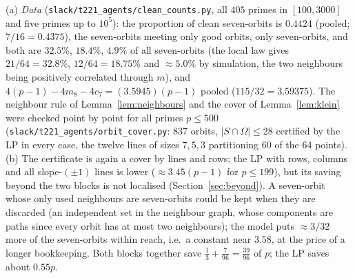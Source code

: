 \begin{remark}
(a) \emph{Data} (\texttt{slack/t221\_agents/clean\_counts.py}, all $405$ primes in $[100,3000]$ and five primes up to $10^5$): the
proportion of clean seven-orbits is $0.4424$ (pooled; $7/16=0.4375$), the seven-orbits meeting only good orbits, only seven-orbits, and
both are $32.5\%$, $18.4\%$, $4.9\%$ of all seven-orbits (the local law gives $21/64=32.8\%$, $12/64=18.75\%$ and $\approx5.0\%$ by
simulation, the two neighbours being positively correlated through $m$), and $4(p-1)-4m_8-4c_7=(3.5945)(p-1)$ pooled
($115/32=3.59375$).  The neighbour rule of Lemma~\ref{lem:neighbours} and the cover of Lemma~\ref{lem:klein} were checked
point by point for all primes $p\le500$ (\texttt{slack/t221\_agents/orbit\_cover.py}: $837$ orbits, $|S\cap\Omega|\le28$ certified by
the LP in every case, the twelve lines of sizes $7,5,3$ partitioning $60$ of the $64$ points).
(b) The certificate is again a cover by lines and rows; the LP with rows, columns and all slope-$(\pm1)$ lines is lower ($\approx3.45(p-1)$
for $p\le199$), but its saving beyond the two blocks is not localised (Section~\ref{sec:beyond}).  A seven-orbit whose only used neighbours
are seven-orbits could be kept when they are discarded (an independent set in the neighbour graph, whose components are paths since every
orbit has at most two neighbours); the model puts $\approx3/32$ more of the seven-orbits within reach, i.e.\ a constant near $3.58$, at the
price of a longer bookkeeping.  Both blocks together save $\tfrac13+\tfrac7{96}=\tfrac{39}{96}$ of $p$; the LP saves about $0.55p$.
\end{remark}
